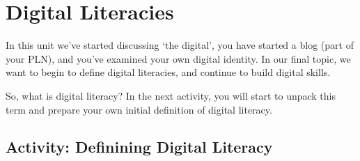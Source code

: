 \documentclass[
]{book}
\theoremstyle{definition}
\theoremstyle{definition}
\theoremstyle{definition}
\theoremstyle{definition}
\theoremstyle{remark}
\begin{document}
\hypertarget{digital-literacies-1}{%
\section{Digital Literacies}\label{digital-literacies-1}}

In this unit we've started discussing `the digital', you have started a blog (part of your PLN), and you've examined your own digital identity. In our final topic, we want to begin to define digital literacies, and continue to build digital skills.

So, what is digital literacy? In the next activity, you will start to unpack this term and prepare your own initial definition of digital literacy.

\hypertarget{activity-definining-digital-literacy}{%
\subsection*{Activity: Definining Digital Literacy}\label{activity-definining-digital-literacy}}
\end{document}
